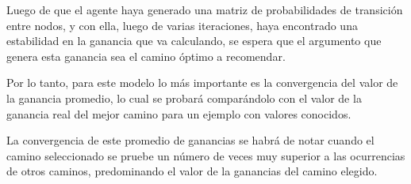 Luego de que el agente haya generado una matriz de probabilidades de transición entre nodos, y con ella, luego de varias iteraciones, haya encontrado una estabilidad en la ganancia que va calculando, se espera que el argumento que genera esta ganancia sea el camino óptimo a recomendar.

Por lo tanto, para este modelo lo más importante es la convergencia del valor de la ganancia promedio, lo cual se probará comparándolo con el valor de la ganancia real del mejor camino para un ejemplo con valores conocidos.

La convergencia de este promedio de ganancias se habrá de notar cuando el camino seleccionado se pruebe un número de veces muy superior a las ocurrencias de otros caminos, predominando el valor de la ganancias del camino elegido.




